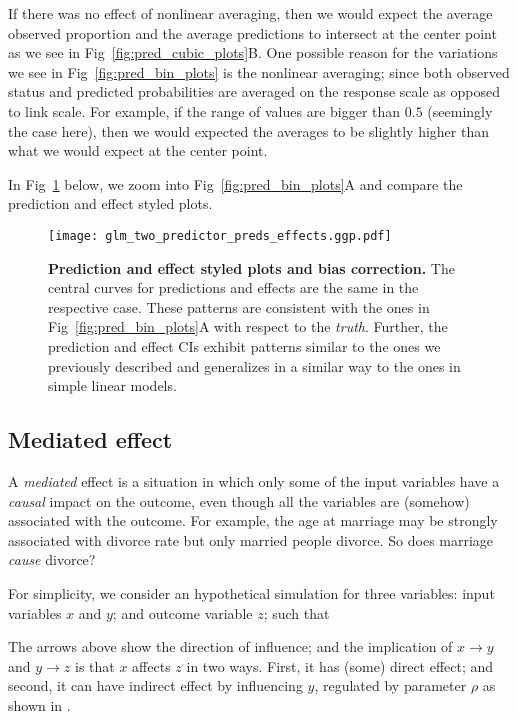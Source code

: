If there was no effect of nonlinear averaging, then we would expect the average observed proportion and the average predictions to intersect at the center point as we see in Fig~\ref{fig:pred_cubic_plots}B. One possible reason for the variations we see in Fig~\ref{fig:pred_bin_plots} is the nonlinear averaging; since both observed status and predicted probabilities are averaged on the response scale as opposed to link scale. For example, if the range of values are bigger than $0.5$ (seemingly the case here), then we would expected the averages to be slightly higher than what we would expect at the center point.

In Fig~\ref{fig:pred_bin_prediction_effects_plots} below, we zoom into Fig~\ref{fig:pred_bin_plots}{A} and compare the prediction and effect styled plots. 

\begin{figure}
\begin{center}
\texttt{[image: glm\_two\_predictor\_preds\_effects.ggp.pdf]}
\end{center}
\caption{{\bf Prediction and effect styled plots and bias correction.} The central curves for predictions and effects are the same in the respective case. These patterns are  consistent with the ones in Fig~\ref{fig:pred_bin_plots}A with respect to the \emph{truth}. Further, the prediction and effect CIs exhibit patterns similar to the ones we previously described and generalizes in a similar way to the ones in simple linear models.
}
\label{fig:pred_bin_prediction_effects_plots}
\end{figure}


\subsection{Mediated effect}

A \emph{mediated} effect is a situation in which only some of the input variables have a \emph{causal} impact on the outcome, even though all the variables are (somehow) associated with the outcome. For example, the age at marriage may be strongly associated with divorce rate but only married people divorce. So does marriage \emph{cause} divorce?

For simplicity, we consider an hypothetical simulation for three variables: input variables $x$ and $y$; and outcome variable $z$; such that
%
\begin{center}
\end{center}
%
The arrows above show the direction of influence; and the implication of $x\rightarrow y$ and $y \rightarrow z$ is that $x$ affects $z$ in two ways. First, it has (some) direct effect; and second, it can have indirect effect by influencing $y$, regulated by parameter $\rho$ as shown in .

